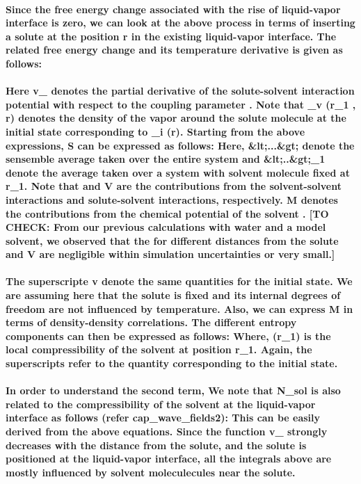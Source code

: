 \documentclass[a4paper,12pt,single,pdftex]{scrartcl}
\begin{document}
{\label{ID_1074911865}\paragraph{Since the free energy change associated with the rise of liquid-vapor interface is zero, we can look at the above process in terms of inserting a solute at the position r in the existing liquid-vapor interface. The related free energy change and its temperature derivative is given as follows:}

\label{ID_388366021}\paragraph{Here v_{\Psi} denotes the partial derivative of the solute-solvent interaction potential with respect to the coupling parameter \lambda. Note that \rho_v (r_1 , r) denotes the density of the vapor around the solute molecule at the initial state corresponding to \Omega_i (r). Starting from the above expressions, \delta S can be expressed as follows: Here, &lt;...&gt; denote the sensemble average taken over the entire system and &lt;..&gt;_1 denote the average taken over a system with solvent molecule fixed at r_1.  Note that \Phi and V are the contributions from the solvent-solvent interactions and solute-solvent interactions, respectively. M denotes the contributions from the chemical potential of the solvent . [TO CHECK: From our previous calculations with water and a model solvent, we observed that the for different distances from the solute \Phi and V are negligible within simulation uncertainties or very small.]}

\label{ID_349834534}\paragraph{The superscripte v denote the same quantities for the initial state. We are assuming here that the solute is fixed and its internal degrees of freedom are not influenced by temperature. Also, we can express M in terms of density-density correlations. The different entropy components can then be expressed as follows: Where, \chi (r_1) is the local compressibility of the solvent at position r_1. Again, the superscripts  refer to the quantity corresponding to the initial state.}

\label{ID_1103070320}\paragraph{In order to understand the second term, We note that \Delta N_{sol} is also related to the compressibility of the solvent at the liquid-vapor interface as follows (refer cap_wave_fields2):  This can be easily derived from the above equations. Since the function v_{\Psi} strongly decreases with the distance from the solute, and the solute is positioned at the liquid-vapor interface, all the integrals above are mostly influenced by solvent moleculecules near the solute.}

}
\end{document}
